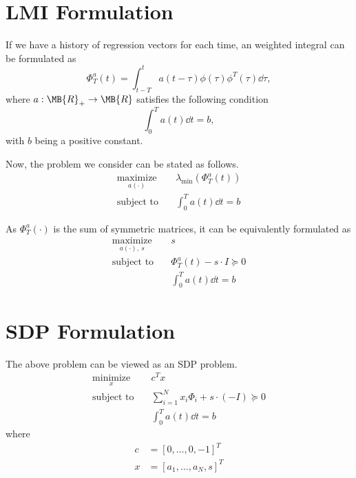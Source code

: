 \documentclass[nobib]{my-handout}
\begin{document}
\section{LMI Formulation}

If we have a history of regression vectors for each time, an weighted integral
can be formulated as
\[ \Phi_T^a(t) = \int_{t-T}^t a(t-\tau) \phi(\tau) \phi^T(\tau) \dd{\tau}, \]
where $a : \MB{R}_{+} \to \MB{R}$ satisfies the following condition
\[ \int_0^T a(t) \dd{t} = b, \]
with $b$ being a positive constant.

Now, the problem we consider can be stated as follows.
\begin{equation*}
	\begin{aligned}
		\operatorname*{maximize}_{a(\cdot)}\quad & \lambda_{\min} (\Phi_T^a(t)) \\
		\text{subject to}\quad & \int_0^T a(t) \dd{t} = b
	\end{aligned}
\end{equation*}

As $\Phi_T^a(\cdot)$ is the sum of symmetric matrices, it can be equivalently
formulated as
\begin{equation*}
	\begin{aligned}
		\operatorname*{maximize}_{a(\cdot),\ s}\quad & s \\
		\text{subject to}\quad & \Phi_T^a(t) - s \cdot I \succeq 0\\
		& \int_0^T a(t) \dd{t} = b
	\end{aligned}
\end{equation*}


\section{SDP Formulation}

The above problem can be viewed as an SDP problem.
\begin{equation*}
	\begin{aligned}
		\operatorname*{minimize}_{x}\quad & c^T x \\
		\text{subject to}\quad & \sum_{i=1}^N x_i \Phi_i + s \cdot (-I) \succeq 0\\
		& \int_0^T a(t) \dd{t} = b
	\end{aligned}
\end{equation*}
where
\begin{equation*}
	\begin{aligned}
		c &= [0, \dotsc, 0, -1]^T \\
		x &= [a_1, \dotsc, a_N, s]^T \\
	\end{aligned}
\end{equation*}
\end{document}
